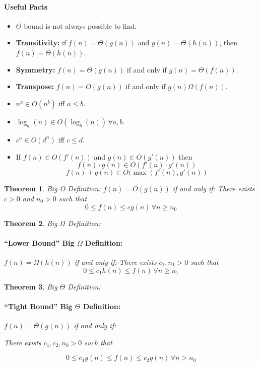 \documentclass[a4paper,12pt]{report}
\newtheorem{theorem}{Theorem}
\begin{document}
\paragraph{Useful Facts} 
\begin{itemize}
\item $\Theta$ bound is not always possible to find. 
\item \textbf{Transitivity: } if $f(n) = \Theta(g(n))$ and $g(n) = \Theta(h(n))$, then $f(n) = \Theta(h(n))$.
\item \textbf{Symmetry: } $f(n) = \Theta(g(n))$ if and only if $g(n) = \Theta(f(n))$.
\item \textbf{Transpose: } $f(n) = O(g(n))$ if and only if $g(n) \Omega(f(n))$.
\item $n^a \in O(n^b)$ iff $a \leq b$.
\item $\log_a(n) \in O(\log_b(n)) \, \forall a, b$.
\item $c^n \in O(d^n)$ iff $c\leq d$.
\item If $f(n) \in O(f'(n))$ and $g(n) \in O(g'(n))$ then $$f(n)\cdot g(n) \in O(f'(n)\cdot g'(n))$$
$$f(n) + g(n) \in O(\max(f'(n), g'(n))$$
\end{itemize}




\begin{theorem}{Big O Definition:}
$f(n) = O(g(n))$ if and only if: 
There exists $c > 0$ and $n_0 > 0$ such that
\begin{equation}
0 \leq f(n) \leq cg(n)\,\forall n \geq n_0 
\end{equation}
\end{theorem}


\begin{theorem}{Big $\Omega$ Definition:}
\paragraph{``Lower Bound'' Big $\Omega$ Definition: } $f(n) = \Omega(h(n))$ if and only if:
There exists $c_1, n_1 > 0$ such that 
\begin{equation}
0 \leq c_1 h(n) \leq f(n)\, \forall n \geq n_1
\end{equation}
\end{theorem}



\begin{theorem}{Big $\Theta$ Definition:}
\paragraph{``Tight Bound'' Big $\Theta$ Definition: } $f(n) = \Theta(g(n))$ if and only if:

There exists $c_1, c_2, n_0 > 0$ such that 

\begin{equation}
0 \leq c_1 g(n) \leq f(n) \leq c_2 g(n) \, \forall n > n_0
\end{equation}
\end{theorem}
\end{document}
